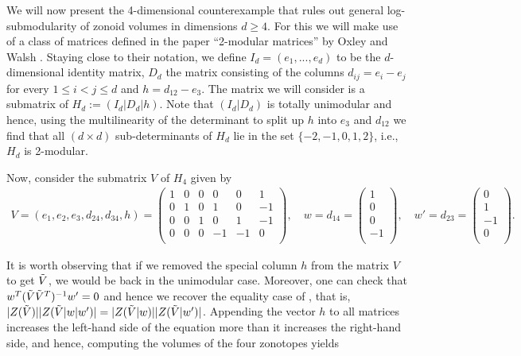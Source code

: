 \documentclass{article}
\theoremstyle{theorem}
\theoremstyle{remark}
\begin{document}

We will now present the 4-dimensional counterexample that rules out general log-submodularity of zonoid volumes in dimensions $d \geq 4$. For this we will make use of a class of matrices defined in the paper ``2-modular matrices'' by Oxley and Walsh \cite{oxley20222}. Staying close to their notation, we define $I_d = (e_1,...,e_d)$ to be the $d$-dimensional identity matrix, $D_d$ the matrix consisting of the columns $d_{ij} = e_i-e_j$ for every $1 \leq i <j \leq d$ and $h = d_{12}-e_3$. The matrix we will consider is a submatrix of $H_d := (I_d|D_d|h)$. Note that $(I_d|D_d)$ is totally unimodular and hence, using the multilinearity of the determinant to split up $h$ into $e_3$ and $d_{12}$ we find that all $(d \times d)$ sub-determinants of $H_d$ lie in the set $\{-2,-1,0,1,2\}$, i.e., $H_d$ is 2-modular.

\par

Now, consider the submatrix $V$ of $H_4$ given by 
\begin{align*}
    V = (e_1,e_2,e_3, d_{24}, d_{34},h)= \begin{pmatrix}
    1& 0& 0&  0&  0& 1\\
    0& 1& 0&  1&  0&-1\\
    0& 0& 1&  0&  1&-1\\
    0& 0& 0& -1& -1& 0\\
    \end{pmatrix}, 
    \quad w =d_{14} = \begin{pmatrix}
    1\\
    0\\
    0\\
    -1\\
    \end{pmatrix},
    \quad w' =d_{23} = \begin{pmatrix}
    0\\
    1\\
    -1\\
    0\\
    \end{pmatrix}.
\end{align*}

It is worth observing that if we removed the special column $h$ from the matrix $V$ to get $\Tilde{V}$, we would be back in the unimodular case. Moreover, one can check that $w^T(\Tilde{V}\Tilde{V}^T)^{-1}w' = 0$ and hence we recover the equality case of , that is, $|Z(\Tilde{V})||Z(\Tilde{V}|w|w')| = |Z(\Tilde{V}|w)||Z(\Tilde{V}|w')|$. Appending the vector $h$ to all matrices increases the left-hand side of the equation more than it increases the right-hand side, and hence, computing the volumes of the four zonotopes yields
\end{document}
